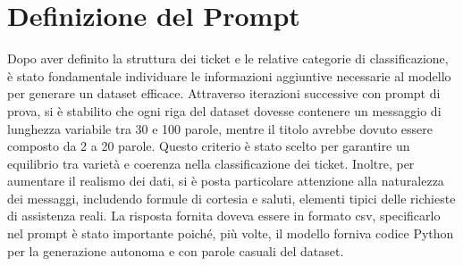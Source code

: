\section{Definizione del Prompt}
Dopo aver definito la struttura dei ticket e le relative categorie di classificazione, è stato fondamentale individuare le informazioni aggiuntive necessarie al modello per generare un dataset efficace. Attraverso iterazioni successive con prompt di prova, si è stabilito che ogni riga del dataset dovesse contenere un messaggio di lunghezza variabile tra 30 e 100 parole, mentre il titolo avrebbe dovuto essere composto da 2 a 20 parole. Questo criterio è stato scelto per garantire un equilibrio tra varietà e coerenza nella classificazione dei ticket. Inoltre, per aumentare il realismo dei dati, si è posta particolare attenzione alla naturalezza dei messaggi, includendo formule di cortesia e saluti, elementi tipici delle richieste di assistenza reali. La risposta fornita doveva essere in formato csv,  specificarlo nel prompt è stato importante poiché, più volte, il modello forniva codice Python per la generazione autonoma e con parole casuali del dataset.
\newpage

